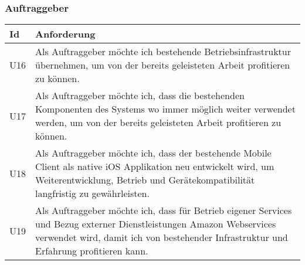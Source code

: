 \subsubsection{Auftraggeber}

\begin{table}[h]
    \centering
    \begin{tabular}{|l|p{15cm}|}
        \hline
        \textbf{Id} & \textbf{Anforderung}                                                                                                                                                                          \\
        \hline
        U16         & Als Auftraggeber möchte ich bestehende Betriebsinfrastruktur übernehmen, um von der bereits geleisteten Arbeit profitieren zu können.                                                     \\
        \hline
        U17         & Als Auftraggeber möchte ich, dass die bestehenden Komponenten des Systems wo immer möglich weiter verwendet werden, um von der bereits geleisteten Arbeit profitieren zu können.               \\
        \hline
        U18         & Als Auftraggeber möchte ich, dass der bestehende Mobile Client als native iOS Applikation neu entwickelt wird, um Weiterentwicklung, Betrieb und Gerätekompatibilität langfristig zu gewährleisten.                            \\
        \hline
        U19         & Als Auftraggeber möchte ich, dass für Betrieb eigener Services und Bezug externer Dienstleistungen Amazon Webservices verwendet wird, damit ich von bestehender Infrastruktur und Erfahrung profitieren kann. \\
        \hline
    \end{tabular}\label{tab:userstories3}
\end{table}

